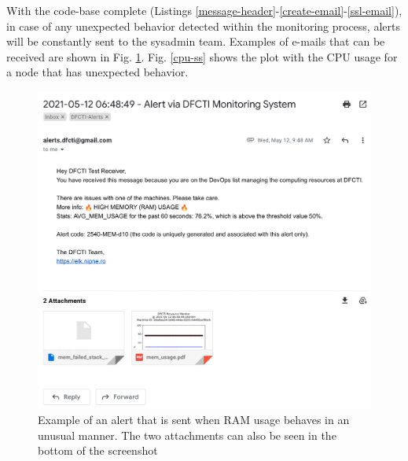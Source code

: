 \documentclass[conference]{IEEEtran}
\begin{document}
With the code-base complete (Listings \ref{message-header}-\ref{create-email}-\ref{ssl-email}), in case of any unexpected behavior detected within the monitoring process, alerts will be constantly sent to the sysadmin team. Examples of e-mails that can be received are shown in Fig. \ref{emails-pics}. Fig. \ref{cpu-ss} shows the plot with the CPU usage for a node that has unexpected behavior.

\begin{figure}[htbp]
    \centering
    \includegraphics[scale=0.4]{figs/example_usecase_ram.png}
    \caption{Example of an alert that is sent when RAM usage behaves in an unusual manner. The two attachments can also be seen in the bottom of the screenshot}
    \label{emails-pics}
\end{figure}
\end{document}
